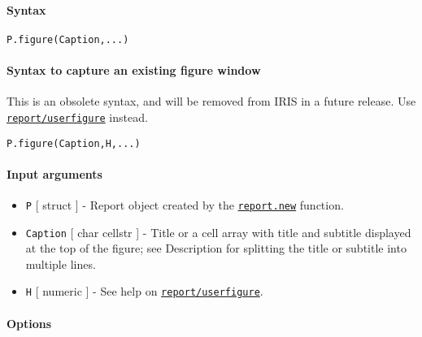 


	\paragraph{Syntax}\label{syntax}

\begin{verbatim}
P.figure(Caption,...)
\end{verbatim}

\paragraph{Syntax to capture an existing figure
window}\label{syntax-to-capture-an-existing-figure-window}

This is an obsolete syntax, and will be removed from IRIS in a future
release. Use \href{report/userfigure}{\texttt{report/userfigure}}
instead.

\begin{verbatim}
P.figure(Caption,H,...)
\end{verbatim}

\paragraph{Input arguments}\label{input-arguments}

\begin{itemize}
\item
  \texttt{P} {[} struct {]} - Report object created by the
  \href{report/new}{\texttt{report.new}} function.
\item
  \texttt{Caption} {[} char \textbar{} cellstr {]} - Title or a cell
  array with title and subtitle displayed at the top of the figure; see
  Description for splitting the title or subtitle into multiple lines.
\item
  \texttt{H} {[} numeric {]} - See help on
  \href{report/userfigure}{\texttt{report/userfigure}}.
\end{itemize}

\paragraph{Options}\label{options}

